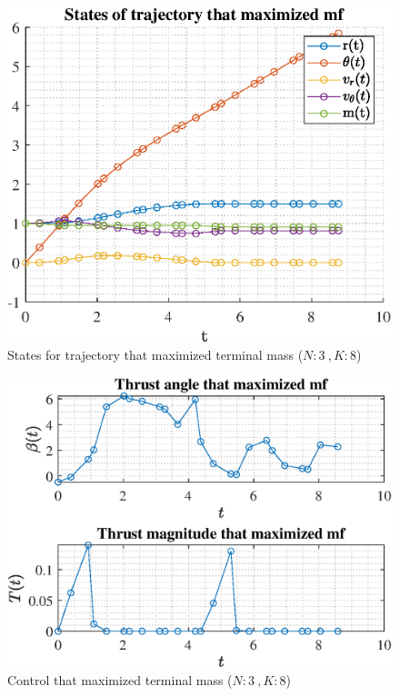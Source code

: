 \documentclass[]{article}
\begin{document}
	\begin{figure}
		\centering
		\includegraphics[scale=0.75]{states_N3_K8_C3_mf.eps}
		\caption{States for trajectory that maximized terminal mass (\(N:3\ , K:8\))}
		\label{fig:states_N3_K8_C3_mf}
	\end{figure}
	\begin{figure}
		\centering
		\includegraphics[scale=0.75]{control_N3_K8_C3_mf.eps}
		\caption{Control that maximized terminal mass (\(N:3\ , K:8\))}
		\label{fig:control_N3_K8_C3_mf}
	\end{figure}
\end{document}
